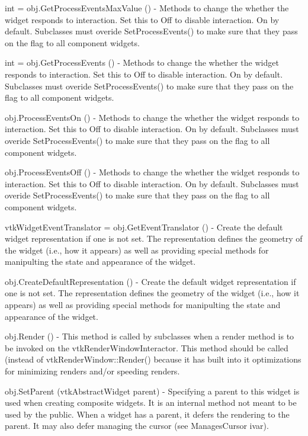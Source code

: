 \begin{DoxyItemize}
\item {\ttfamily int = obj.\-Get\-Process\-Events\-Max\-Value ()} -\/ Methods to change the whether the widget responds to interaction. Set this to Off to disable interaction. On by default. Subclasses must overide Set\-Process\-Events() to make sure that they pass on the flag to all component widgets.  
\item {\ttfamily int = obj.\-Get\-Process\-Events ()} -\/ Methods to change the whether the widget responds to interaction. Set this to Off to disable interaction. On by default. Subclasses must overide Set\-Process\-Events() to make sure that they pass on the flag to all component widgets.  
\item {\ttfamily obj.\-Process\-Events\-On ()} -\/ Methods to change the whether the widget responds to interaction. Set this to Off to disable interaction. On by default. Subclasses must overide Set\-Process\-Events() to make sure that they pass on the flag to all component widgets.  
\item {\ttfamily obj.\-Process\-Events\-Off ()} -\/ Methods to change the whether the widget responds to interaction. Set this to Off to disable interaction. On by default. Subclasses must overide Set\-Process\-Events() to make sure that they pass on the flag to all component widgets.  
\item {\ttfamily vtk\-Widget\-Event\-Translator = obj.\-Get\-Event\-Translator ()} -\/ Create the default widget representation if one is not set. The representation defines the geometry of the widget (i.\-e., how it appears) as well as providing special methods for manipulting the state and appearance of the widget.  
\item {\ttfamily obj.\-Create\-Default\-Representation ()} -\/ Create the default widget representation if one is not set. The representation defines the geometry of the widget (i.\-e., how it appears) as well as providing special methods for manipulting the state and appearance of the widget.  
\item {\ttfamily obj.\-Render ()} -\/ This method is called by subclasses when a render method is to be invoked on the vtk\-Render\-Window\-Interactor. This method should be called (instead of vtk\-Render\-Window\-::\-Render() because it has built into it optimizations for minimizing renders and/or speeding renders.  
\item {\ttfamily obj.\-Set\-Parent (vtk\-Abstract\-Widget parent)} -\/ Specifying a parent to this widget is used when creating composite widgets. It is an internal method not meant to be used by the public. When a widget has a parent, it defers the rendering to the parent. It may also defer managing the cursor (see Manages\-Cursor ivar).  

\end{DoxyItemize}
